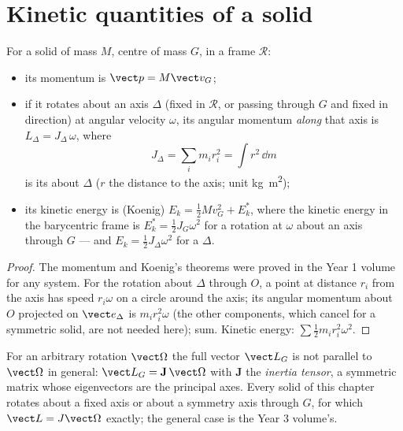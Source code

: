 \section{Kinetic quantities of a solid}

\begin{proposition}\label{prop:b2:rigid-body-mechanics:kinetic}
For a solid of mass $M$, centre of mass $G$, in a frame $\mathcal R$:
\begin{itemize}
  \item its momentum is $\vect p = M\vect v_G$;
  \item if it rotates about an axis $\Delta$ (fixed in $\mathcal R$, or
        passing through $G$ and fixed in direction) at angular velocity
        $\omega$, its angular momentum \emph{along} that axis is
        $L_\Delta = J_\Delta\,\omega$, where
        \[
        J_\Delta = \sum_i m_i r_i^2 = \int r^2\,\dd m
        \]
        is its \emph{} about $\Delta$ ($r$ the distance to
        the axis; unit \unit{kg.m^2});
  \item its kinetic energy is (Koenig) $E_k = \tfrac12Mv_G^2 +
        E_k^*$, where the kinetic energy in the barycentric frame is
        $E_k^* = \tfrac12J_{G}\omega^2$ for a rotation at $\omega$ about
        an axis through $G$ --- and $E_k = \tfrac12J_\Delta\omega^2$ for a
         $\Delta$.
\end{itemize}
\end{proposition}

\begin{proof}
The momentum and Koenig's theorems were proved in the Year 1 volume for
any system. For the rotation about $\Delta$ through $O$, a point at
distance $r_i$ from the axis has speed $r_i\omega$ on a circle around
the axis; its angular momentum about $O$ projected on $\vect e_\Delta$ is
$m_ir_i^2\omega$ (the other components, which cancel for a symmetric
solid, are not needed here); sum. Kinetic energy: $\sum\tfrac12m_ir_i^2
\omega^2$.
\end{proof}

\begin{remark}\label{rem:b2:rigid-body-mechanics:tensor}
For an arbitrary rotation $\vect\Omega$ the full vector $\vect L_G$ is
not parallel to $\vect\Omega$ in general: $\vect L_G = \mathbf J\,\vect\Omega$
with $\mathbf J$ the \emph{inertia tensor}, a symmetric matrix whose
eigenvectors are the principal axes. Every solid of this chapter
rotates about a fixed axis or about a symmetry axis through $G$, for
which $\vect L = J\vect\Omega$ exactly; the general case is the Year 3
volume's.
\end{remark}

